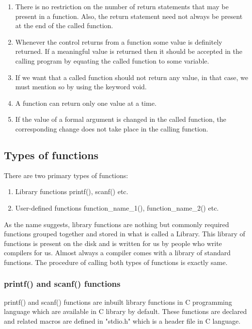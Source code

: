 \begin{enumerate}
\begin{enumerate}
    \end{enumerate}
    \item There is no restriction on the number of return statements that may be present in a function. Also, the return statement need not always be present at the end of the called function. 
    \item Whenever the control returns from a function some value is definitely returned. If a meaningful value is returned then it should be accepted in the calling program by equating the called function to some variable.
    \item If we want that a called function should not return any value, in that case, we must mention so by using the keyword void.
    \item A function can return only one value at a time.
    \item If the value of a formal argument is changed in the called function, the corresponding change does not take place in the calling function.
\end{enumerate}
    
\subsection{Types of functions}
There are two primary types of functions: 
\begin{enumerate}
    \item Library functions \eg printf(), scanf() etc.
    \item User-defined functions \eg function\_name\_1(), function\_name\_2() etc.
\end{enumerate}
As the name suggests, library functions are nothing but commonly required functions grouped together and stored in what is called a Library. This library of functions is present on the disk and is written for us by people who write compilers for us. Almost always a compiler comes with a library of standard functions. The procedure of calling both types of functions is exactly same.

\subsubsection{printf() and scanf() functions}
printf() and scanf() functions are inbuilt library functions in C programming language which are available in C library by default. These functions are declared and related macros are defined in "stdio.h" which is a header file in C language.

